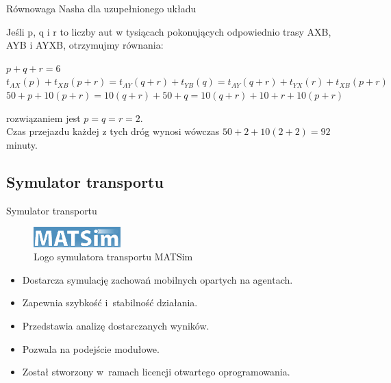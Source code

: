 \documentclass{beamer}
\begin{document}
\begin{frame}{Równowaga Nasha dla uzupełnionego układu} 

Jeśli p, q i r to liczby aut w tysiącach pokonujących odpowiednio trasy AXB, AYB i AYXB, otrzymujmy równania:

\begin{center}
$p+q+r = 6 $\\
$t_{AX}(p)+t_{XB}(p+r) = t_{AY}(q+r) + t_{YB}(q) = t_{AY}(q+r)+t_{YX}(r)+t_{XB}(p+r)$
\newline\\
$50+p+10(p+r) = 10(q+r)+50+q = 10(q+r)+ 10 + r + 10(p+r)$
\end{center}
rozwiązaniem jest $p=q=r=2$.\\
Czas przejazdu każdej z tych dróg wynosi wówczas $50+2+10(2+2)=92$ minuty.
\end{frame}


\subsection{Symulator transportu}
\begin{frame}{Symulator transportu} 

\begin{figure}[b]
\includegraphics[width=0.30\textwidth]{img/matsim}
\caption{Logo symulatora transportu MATSim}
\end{figure}

\begin{itemize}
\item{Dostarcza symulację zachowań mobilnych opartych na agentach.} 
\item{Zapewnia szybkość i~stabilność działania.} 
\item{Przedstawia analizę dostarczanych wyników.} 
\item{Pozwala na podejście modułowe.} 
\item{Został stworzony w~ramach licencji otwartego oprogramowania.} 
\end{itemize}

\end{frame}
\end{document}
